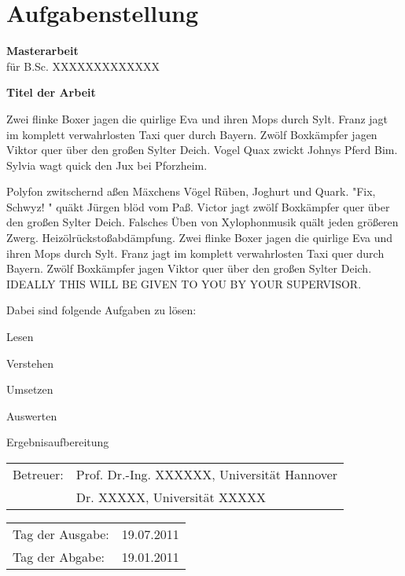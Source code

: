 \chapter*{Aufgabenstellung}

\textbf{Masterarbeit}\\
für B.Sc. XXXXXXXXXXXXX

\begin{center}
  \textbf{Titel der Arbeit}
\end{center}
\medskip

\noindent Zwei flinke Boxer jagen die quirlige Eva und ihren Mops durch Sylt. Franz jagt im komplett verwahrlosten Taxi quer durch Bayern. Zwölf Boxkämpfer jagen Viktor quer über den großen Sylter Deich. Vogel Quax zwickt Johnys Pferd Bim. Sylvia wagt quick den Jux bei Pforzheim.

\noindent Polyfon zwitschernd aßen Mäxchens Vögel Rüben, Joghurt und Quark. "Fix, Schwyz! " quäkt Jürgen blöd vom Paß. Victor jagt zwölf Boxkämpfer quer über den großen Sylter Deich. Falsches Üben von Xylophonmusik quält jeden größeren Zwerg. Heizölrückstoßabdämpfung. Zwei flinke Boxer jagen die quirlige Eva und ihren Mops durch Sylt. Franz jagt im komplett verwahrlosten Taxi quer durch Bayern. Zwölf Boxkämpfer jagen Viktor quer über den großen Sylter Deich. IDEALLY THIS WILL BE GIVEN TO YOU BY YOUR SUPERVISOR.

\medskip
Dabei sind folgende Aufgaben zu lösen:
\begin{itemize*}
 \item Lesen
 \item Verstehen
 \item Umsetzen
 \item Auswerten
 \item Ergebnisaufbereitung
\end{itemize*}


\begin{flushleft}
\begin{tabular}{l l}
  Betreuer: & Prof. Dr.-Ing. XXXXXX, Universität Hannover\\
  					& Dr. XXXXX, Universität XXXXX\\
\end{tabular}

\vspace{0.3cm}

\begin{tabular}{l l}
  Tag der Ausgabe:& 19.07.2011\\
  Tag der Abgabe:& 19.01.2011
\end{tabular}
\end{flushleft}




